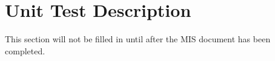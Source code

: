 \documentclass[12pt, titlepage]{article}
\begin{document}
\section{Unit Test Description}
This section will not be filled in until after the MIS document has been completed.







\end{document}
